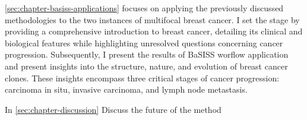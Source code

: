 \cref{sec:chapter-basiss-applications} focuses on applying the previously discussed methodologies to the two instances of multifocal breast cancer. I set the stage by providing a comprehensive introduction to breast cancer, detailing its clinical and biological features while highlighting unresolved questions concerning cancer progression. Subsequently, I present the results of \ac{BaSISS} worflow application and present insights into the structure, nature, and evolution of breast cancer clones. These insights encompass three critical stages of cancer progression: carcinoma in situ, invasive carcinoma, and lymph node metastasis.

In \cref{sec:chapter-discussion} Discuss the future of the method









